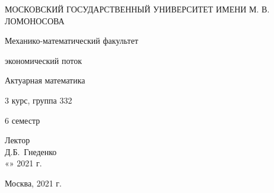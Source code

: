 \begin{titlepage}
  \begin{center}
    \large
 
 	МОСКОВСКИЙ ГОСУДАРСТВЕННЫЙ УНИВЕРСИТЕТ ИМЕНИ М. В. ЛОМОНОСОВА 
    \vspace{2cm}
     
    Механико-математический факультет
    \vspace{0.8cm} 
      
    экономический поток
    \vspace{0.8cm} 
     
    {\LARGE Актуарная математика}
    
    \vspace{0.8cm} 
    3 курс, группа 332

    \vspace{0.8cm} 
    6 семестр
\end{center}
\vfill
 
\newlength{\ML}
\hfill\begin{minipage}{0.3\textwidth}
  Лектор\\
  Д.Б.~Гнеденко\\
  «\underline{\hspace{0.7cm}}» \underline{\hspace{2cm}} 2021 г.
\end{minipage}
\vfill
\bigskip
 
\begin{center}
  Москва, 2021 г.
\end{center}
\end{titlepage}
\newpage